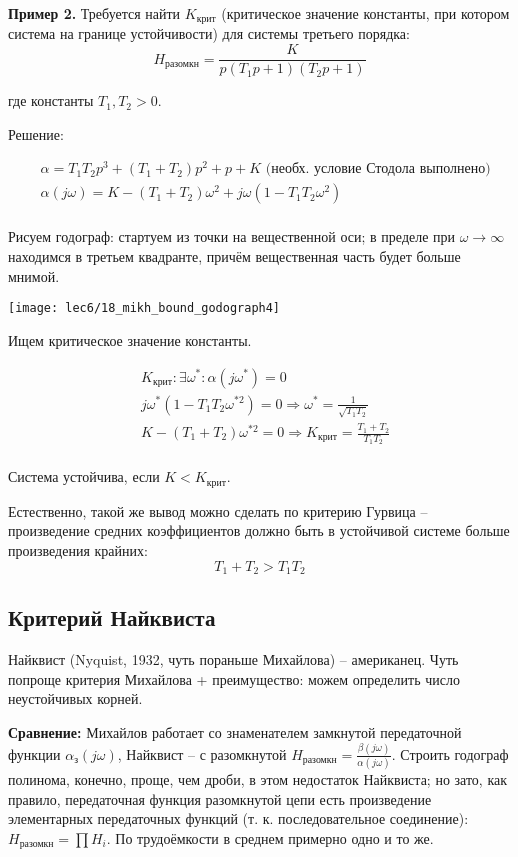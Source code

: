 \documentclass[main.tex]{subfiles}
\begin{document}
\textbf{Пример 2.} Требуется найти $ K_{\text{крит}} $ (критическое значение константы, при котором система на границе устойчивости) для системы третьего порядка:
$$ H_{\text{разомкн}} = \frac{K}{p(T_1 p + 1)(T_2 p + 1)} $$

где константы $ T_1, T_2 > 0 $.

Решение:

\begin{align*}
	& \alpha = T_1 T_2 p^3 + (T_1 + T_2) p^2 + p + K \text{ (необх. условие Стодола выполнено)} \\
    & \alpha(j \omega) = K - (T_1 + T_2) \omega^2 + j \omega (1 - T_1 T_2 \omega^2) \\
\end{align*}

Рисуем годограф: стартуем из точки на вещественной оси; в пределе при $ \omega \to \infty $ находимся в третьем квадранте, причём вещественная часть будет больше мнимой.

\texttt{[image: lec6/18\_mikh\_bound\_godograph4]}

Ищем критическое значение константы.

\begin{align*}
    & K_{\text{крит}} : \exists \omega^* : \alpha(j \omega^*) = 0 \\
    & j \omega^* (1 - T_1 T_2 \omega^{*2}) = 0 \Rightarrow \omega^* = \frac{1}{\sqrt{T_1 T_2}} \\
    & K - (T_1 + T_2) \omega^{*2} = 0 \Rightarrow K_{\text{крит}} = \frac{T_1 + T_2}{T_1 T_2} \\
\end{align*}

Система устойчива, если $ K < K_{\text{крит}} $.

Естественно, такой же вывод можно сделать по критерию Гурвица -- произведение средних коэффициентов должно быть в устойчивой системе больше произведения крайних:
$$ T_1 + T_2 > T_1 T_2 $$

\subsection{Критерий Найквиста}
Найквист (Nyquist, 1932, чуть пораньше Михайлова) -- американец.
Чуть попроще критерия Михайлова + преимущество: можем определить число неустойчивых корней.

\textbf{Сравнение:} Михайлов работает со знаменателем замкнутой передаточной функции $ \alpha_{\text{з}}(j \omega) $, Найквист -- с разомкнутой $ H_{\text{разомкн}} = \frac{\beta(j \omega)}{\alpha(j \omega)} $.
Строить годограф полинома, конечно, проще, чем дроби, в этом недостаток Найквиста; но зато, как правило, передаточная функция разомкнутой цепи есть произведение элементарных передаточных функций (т. к. последовательное соединение): $ H_{\text{разомкн}} = \prod H_i $.
По трудоёмкости в среднем примерно одно и то же. \\
\end{document}
